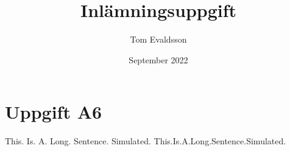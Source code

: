 \documentclass{article}
\title{Inlämningsuppgift}
\author{Tom Evaldsson}
\date{September 2022}
\begin{document}
\maketitle

\section{Uppgift A6}
This. Is. A. Long. Sentence. Simulated.
This.Is.A.Long.Sentence.Simulated.
\end{document}
